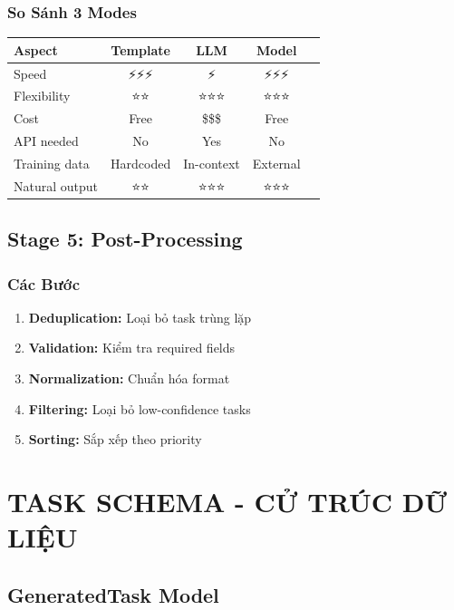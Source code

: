 \documentclass[12pt, a4paper]{report}
\begin{document}
\subsection{So Sánh 3 Modes}

\begin{table}[h]
\centering
\begin{tabular}{|l|c|c|c|c|}
\hline
\textbf{Aspect} & \textbf{Template} & \textbf{LLM} & \textbf{Model} \\
\hline
Speed & ⚡⚡⚡ & ⚡ & ⚡⚡⚡ \\
Flexibility & ⭐⭐ & ⭐⭐⭐ & ⭐⭐⭐ \\
Cost & Free & \$\$\$ & Free \\
API needed & No & Yes & No \\
Training data & Hardcoded & In-context & External \\
Natural output & ⭐⭐ & ⭐⭐⭐ & ⭐⭐⭐ \\
\hline
\end{tabular}
\end{table}

\section{Stage 5: Post-Processing}

\subsection{Các Bước}

\begin{enumerate}
    \item \textbf{Deduplication:} Loại bỏ task trùng lặp
    \item \textbf{Validation:} Kiểm tra required fields
    \item \textbf{Normalization:} Chuẩn hóa format
    \item \textbf{Filtering:} Loại bỏ low-confidence tasks
    \item \textbf{Sorting:} Sắp xếp theo priority
\end{enumerate}

\newpage

\chapter{TASK SCHEMA - CỬ TRÚC DỮ LIỆU}

\section{GeneratedTask Model}
\end{document}
